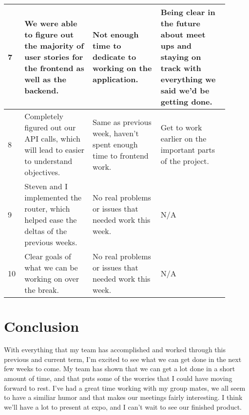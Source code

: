 \documentclass[onecolumn, draftclsnofoot,10pt, compsoc]{IEEEtran}
\begin{document}
\begin{tabular}{|p{0.05\linewidth}|p{0.285\linewidth}|p{0.285\linewidth}|p{0.285\linewidth}|}
	7
	& We were able to figure out the majority of user stories for the frontend as well as the backend.
	& Not enough time to dedicate to working on the application.
	& Being clear in the future about meet ups and staying on track with everything we said we'd be getting done. \\ \hline

	8
	& Completely figured out our API calls, which will lead to easier to understand objectives.
	& Same as previous week, haven't spent enough time to frontend work.
	& Get to work earlier on the important parts of the project. \\ \hline

	9
	& Steven and I implemented the router, which helped ease the deltas of the previous weeks.
	& No real problems or issues that needed work this week.
	& N/A \\ \hline

	10
	& Clear goals of what we can be working on over the break.
	& No real problems or issues that needed work this week.
	& N/A \\ \hline

\end{tabular}
\clearpage
\section{Conclusion}
With everything that my team has accomplished and worked through this previous and current term, I'm excited to see what we can get done in the next few 
weeks to come. My team has shown that we can get a lot done in a short amount of time, and that puts some of the worries that I could have moving forward 
to rest. I've had a great time working with my group mates, we all seem to have a similiar humor and that makes our meetings fairly interesting. I think 
we'll have a lot to present at expo, and I can't wait to see our finished product. \\
\end{document}

